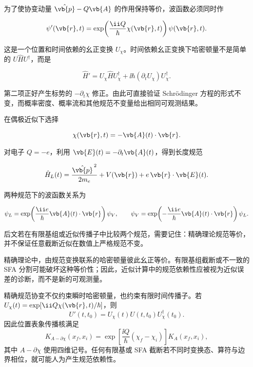 为了使协变动量 \(\hat{\vb{p}}-Q\vb{A}\) 的作用保持等价，波函数必须同时作

\begin{equation}
\psi'(\vb{r},t)
=
\exp\!\left(\frac{\ii Q}{\hbar}\chi(\vb{r},t)\right)
\psi(\vb{r},t).
\label{eq:gauge-wavefunction}
\end{equation}

这是一个位置和时间依赖的幺正变换 \(U_\chi\)。时间依赖幺正变换下哈密顿量不是简单的 \(U\hat H U^\dagger\)，而是

\[
\hat H'
=U_\chi\hat H U_\chi^\dagger
+\ii\hbar(\partial_tU_\chi)U_\chi^\dagger.
\]

第二项正好产生标势的 \(-\partial_t\chi\) 修正。由此可直接验证 Schrödinger 方程的形式不变，而概率密度、概率流和其他规范不变量给出相同可观测结果。

在偶极近似下选择

\[
\chi(\vb{r},t)=-\vb{A}(t)\cdot\vb{r}.
\]

对电子 \(Q=-e\)，利用 \(\vb{E}(t)=-\partial_t\vb{A}(t)\)，得到长度规范

\[
\hat H_L(t)
=\frac{\hat{\vb{p}}^{\,2}}{2m_e}
+V(\vb{r})
+e\,\vb{r}\cdot\vb{E}(t).
\]

两种规范下的波函数关系为

\[
\psi_L
=\exp\!\left(\frac{\ii e}{\hbar}\vb{A}(t)\cdot\vb{r}\right)\psi_V,
\qquad
\psi_V
=\exp\!\left(-\frac{\ii e}{\hbar}\vb{A}(t)\cdot\vb{r}\right)\psi_L.
\]

后文若在有限基组或近似传播子中比较两个规范，需要记住：精确理论规范等价，并不保证任意截断近似在数值上严格规范不变。

\begin{note}[规范截断]
精确理论中，由规范变换联系的哈密顿量彼此幺正等价。有限基组截断或不一致的 SFA 分割可能破坏这种等价性；因此，近似计算中的规范依赖性应被视为近似误差的诊断，而不是新的可观测量。
\end{note}

精确规范协变不仅约束瞬时哈密顿量，也约束有限时间传播子。若 $U_\chi(t)=\exp[\ii Q\chi(\vb{r},t)/\hbar]$，则
\begin{equation}
U'(t,t_0)=U_\chi(t)U(t,t_0)U_\chi^\dagger(t_0).
\label{eq:gauge-covariant-propagator}
\end{equation}
因此位置表象传播核满足
\begin{equation}
K_{A-\partial\chi}(x_f,x_i)
=\exp\!\left[\frac{\ii Q}{\hbar}(\chi_f-\chi_i)\right]K_A(x_f,x_i),
\label{eq:gauge-propagator-endpoint-phase}
\end{equation}
其中 $A-\partial\chi$ 使用四维记号。任何有限基或 SFA 截断若不同时变换态、算符与边界相位，就可能人为产生规范依赖性。

